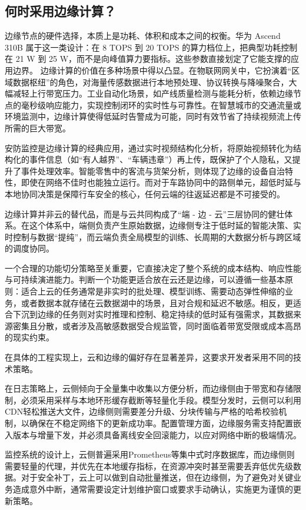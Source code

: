 \subsection{何时采用边缘计算？}\label{src-book-chapter1-h5}

边缘节点的硬件选择，本质上是功耗、体积和成本之间的权衡。华为 Ascend 310B
属于这一类设计：在 8 TOPS 到 20 TOPS 的算力档位上，把典型功耗控制在 21 W
到 25 W，而不是向峰值算力要指标。这些参数直接划定了它能支撑的应用边界。
边缘计算的价值在多种场景中得以凸显。在物联网网关中，它扮演着``区域数据枢纽''的角色，对海量传感数据进行本地预处理、协议转换与降噪聚合，大幅减轻上行带宽压力。工业自动化场景，如产线质量检测与能耗分析，依赖边缘节点的毫秒级响应能力，实现控制闭环的实时性与可靠性。在智慧城市的交通流量或环境监测中，边缘计算使得低延时告警成为可能，同时有效节省了持续视频流上传所需的巨大带宽。

安防监控是边缘计算的经典应用，通过实时视频结构化分析，将原始视频转化为结构化的事件信息（如``有人越界''、``车辆违章''）再上传，既保护了个人隐私，又提升了事件处理效率。智能零售中的客流与货架分析，则体现了边缘的设备自治特性，即使在网络不佳时也能独立运行。而对于车路协同中的路侧单元，超低时延与本地协同决策是保障行车安全的核心，任何云端的往返延迟都是不可接受的。

边缘计算并非云的替代品，而是与云共同构成了``端 - 边 -
云''三层协同的健壮体系。在这个体系中，端侧负责产生原始数据，边缘侧专注于低时延的智能决策、实时控制与数据``提纯''，而云端负责全局模型的训练、长周期的大数据分析与跨区域的调度协同。

一个合理的功能切分策略至关重要，它直接决定了整个系统的成本结构、响应性能与可持续演进能力。判断一个功能更适合放在云还是边缘，可以遵循一些基本原则：适合上云的任务通常是非实时的批处理、模型训练、需要动态弹性伸缩的业务，或者数据本就存储在云数据湖中的场景，且对合规和延迟不敏感。相反，更适合下沉到边缘的任务则对实时推理和控制、稳定持续的低时延有强需求，其数据来源密集且分散，或者涉及高敏感数据受合规监管，同时面临着带宽受限或成本高昂的现实约束。

在具体的工程实现上，云和边缘的偏好存在显著差异，这要求开发者采用不同的技术策略。

在日志策略上，云侧倾向于全量集中收集以方便分析，而边缘侧由于带宽和存储限制，必须采用采样与本地环形缓存截断等轻量化手段。模型分发时，云侧可以利用CDN轻松推送大文件，边缘侧则需要差分升级、分块传输与严格的哈希校验机制，以确保在不稳定网络下的更新成功率。配置管理方面，边缘服务需支持配置嵌入版本与增量下发，并必须具备离线安全回滚能力，以应对网络中断的极端情况。

监控系统的设计上，云侧普遍采用Prometheus等集中式时序数据库，而边缘侧则需要轻量的代理，并优先在本地缓存指标，在资源冲突时甚至需要丢弃低优先级数据。对于安全补丁，云上可以做到自动批量推送，但在边缘侧，为了避免对关键业务造成意外中断，通常需要设定计划维护窗口或要求手动确认，实施更为谨慎的更新策略。

